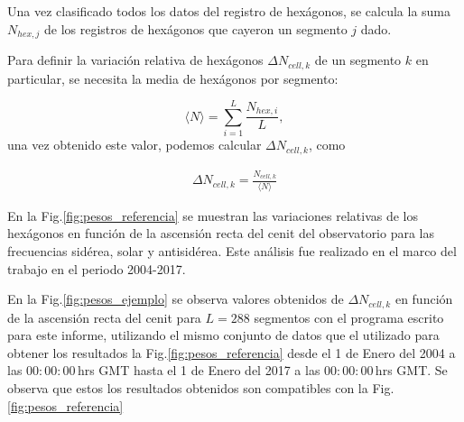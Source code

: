         Una vez clasificado todos los datos del registro de hexágonos, se calcula la suma  $N_{hex, j}$ de los registros de hexágonos que cayeron un segmento $j$ dado.

        Para definir la variación relativa de hexágonos  $\Delta N_{cell,k}$ de un segmento $k$ en particular, se necesita la media de hexágonos por segmento:
       
       \begin{equation}
         \langle N \rangle = \sum^{L}_{i=1} \frac{N_{hex, i}}{L},
         \label{epepe}
       \end{equation}
       una vez obtenido este valor, podemos calcular  $\Delta N_{cell,k}$, como 
      
      \begin{align}
         \Delta N_{cell,k} = \frac{N_{cell, k}}{\langle N \rangle}
      \end{align} 

      En la Fig.\ref{fig:pesos_referencia} se muestran las variaciones relativas de los hexágonos en función de la ascensión recta del cenit del observatorio para las frecuencias sidérea, solar y antisidérea. Este análisis fue realizado en el marco del trabajo \cite{referencia_pesos} en el periodo 2004-2017. 

       En la Fig.\ref{fig:pesos_ejemplo} se observa valores obtenidos de $\Delta N_{cell,k}$ en función de la ascensión recta del cenit  para $L=288$ segmentos con el programa escrito para este informe, utilizando el mismo conjunto de datos que el utilizado para obtener los resultados la Fig.\ref{fig:pesos_referencia} desde el 1 de Enero del 2004 a las $00:00:00\,$hrs GMT  hasta el 1 de Enero del 2017 a las $00:00:00\,$hrs GMT. Se  observa que estos los resultados obtenidos son compatibles con la Fig.\ref{fig:pesos_referencia}
 
